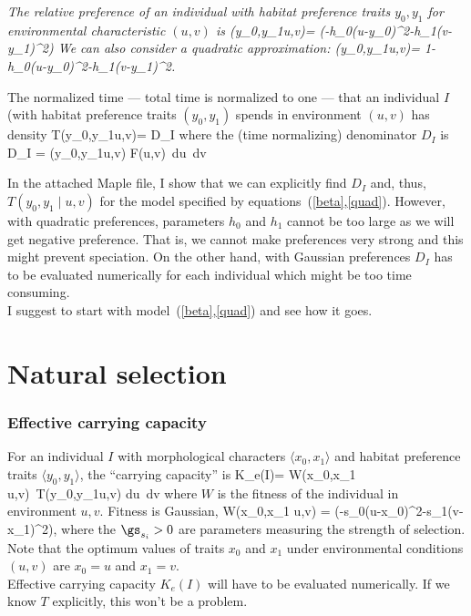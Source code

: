 \documentclass{article}
\begin{document}
{\em The relative preference of an individual with habitat preference
traits $y_0,y_1$ for environmental characteristic $(u,v)$ is
	\be 
	\Xi(y_0,y_1\mid u,v)= \exp(-h_0(u-y_0)^2-h_1(v-y_1)^2)
	\ee
We can also consider a quadratic approximation:
	\be \label{quad}
	\Xi(y_0,y_1\mid u,v)= 1-h_0(u-y_0)^2-h_1(v-y_1)^2.
	\ee
	
The normalized time ---  total time is normalized to one ---
that an individual $I$ (with
habitat preference traits $(y_0,y_1)$ spends in
environment $(u,v)$ has density
\bs
	\be
	   T(y_0,y_1\mid u,v)= 
	    	{D_I}	    
	\ee
where the (time normalizing) denominator $D_I$ is
\be
D_I \; = \; {\int \! \int  \Xi(y_0,y_1\mid u,v) F(u,v) \,du \,dv}
\ee
\es

In the attached Maple file, I show that we can explicitly find $D_I$ and, thus,
$T(y_0,y_1\mid u,v)$ for the model specified by equations~(\ref{beta},\ref{quad}).
However, with quadratic preferences, parameters $h_0$ and $h_1$ cannot be too large as we
will get negative preference. That is, we cannot make preferences very strong
and this might prevent speciation. On the other hand, with Gaussian preferences $D_I$ has to be evaluated
numerically for each individual which might be too time consuming. \\

I suggest to start with model~(\ref{beta},\ref{quad}) and see how it goes.


\section{Natural selection}

\subsubsection{Effective carrying capacity}

For an individual $I$ with morphological characters $\langle x_0,x_1 \rangle$ and habitat preference 
traits $\langle y_0,y_1 \rangle$, the ``carrying capacity'' is
	\bs \label{K}
	\be \label{K-def}
		K_e(I)= \int \! \int W(x_0,x_1 \mid u,v)\  T(y_0,y_1\mid u,v) du \,dv
	\ee
where $W$ is the fitness of the individual in  environment $u,v$.  Fitness is Gaussian,
	\be \label{K-Gaus}
		W(x_0,x_1 \mid u,v) = \exp(-s_0(u-x_0)^2-s_1(v-x_1)^2),
	\ee
	\es
where the $\gs_{s_i}>0$ are parameters measuring the strength of
selection.  Note that the optimum values of traits $x_0$ and $x_1$
under environmental conditions $(u,v)$ are $x_0 = u$ and $x_1 = v$.\\

Effective carrying capacity $K_e(I)$ will have to be evaluated numerically.
If we know $T$ explicitly, this won't be a problem.}
\end{document}
